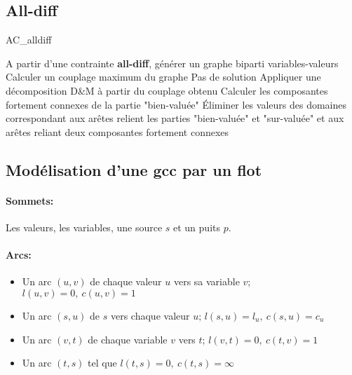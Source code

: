 \documentclass[a4paper,)11pt]{article}
\begin{document}
\subsection*{All-diff}
\begin{algorithm}[!h]
\caption{AC\_alldiff}
\label{AC_ad}
\begin{algorithmic}
\STATE A partir d'une contrainte \textbf{all-diff}, générer un graphe biparti variables-valeurs
\STATE Calculer un couplage maximum du graphe
\STATE Pas de solution
\ENDIF
\STATE Appliquer une décomposition D\&M à partir du couplage obtenu
\STATE Calculer les composantes fortement connexes de la partie "bien-valuée"
\STATE Éliminer les valeurs des domaines correspondant aux arêtes relient les parties "bien-valuée" et "sur-valuée" et aux arêtes reliant deux composantes fortement connexes
\end{algorithmic}
\end{algorithm}

\subsection*{Modélisation d'une gcc par un flot}

\paragraph{Sommets:}
Les valeurs, les variables, une source $s$ et un puits $p$.

\paragraph{Arcs:}
\begin{itemize}
\item Un arc $(u,v)$ de chaque valeur $u$ vers sa variable $v$; $l(u,v)=0,\ c(u,v)=1$
\item Un arc $(s,u)$ de $s$ vers chaque valeur $u$; $l(s,u)=l_u,\ c(s,u)=c_u$
\item Un arc $(v,t)$ de chaque variable $v$ vers $t$; $l(v,t)=0,\ c(t,v)=1$
\item Un arc $(t,s)$ tel que $l(t,s)=0,\ c(t,s)= \infty$
\end{itemize}
\end{document}
